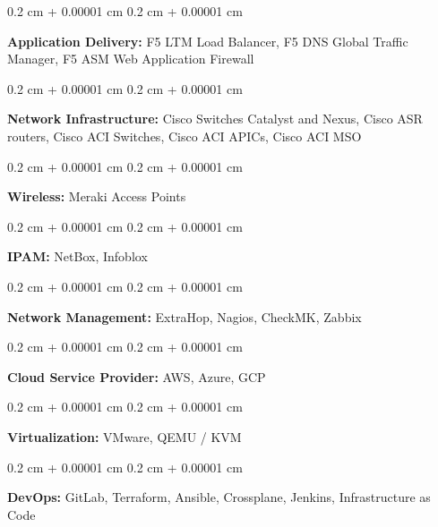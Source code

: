 \documentclass[10pt, a4paper]{article}
\newenvironment{onecolentry}{
    \begin{adjustwidth}{
        0.2 cm + 0.00001 cm
    }{
        0.2 cm + 0.00001 cm
    }
}{
    \end{adjustwidth}
} %
\begin{document}
        \begin{onecolentry}
            \textbf{Application Delivery:} F5 LTM Load Balancer, F5 DNS Global Traffic Manager, F5 ASM Web Application Firewall
        \end{onecolentry}

        \vspace{0.2 cm}

        \begin{onecolentry}
            \textbf{Network Infrastructure:} Cisco Switches Catalyst and Nexus, Cisco ASR routers, Cisco ACI Switches, Cisco ACI APICs, Cisco ACI MSO
        \end{onecolentry}

        \vspace{0.2 cm}

        \begin{onecolentry}
            \textbf{Wireless:} Meraki Access Points
        \end{onecolentry}

        \vspace{0.2 cm}

        \begin{onecolentry}
            \textbf{IPAM:} NetBox, Infoblox
        \end{onecolentry}

        \vspace{0.2 cm}

        \begin{onecolentry}
            \textbf{Network Management:} ExtraHop, Nagios, CheckMK, Zabbix
        \end{onecolentry}

        \vspace{0.2 cm}

        \begin{onecolentry}
            \textbf{Cloud Service Provider:} AWS, Azure, GCP
        \end{onecolentry}

        \vspace{0.2 cm}

        \begin{onecolentry}
            \textbf{Virtualization:} VMware, QEMU / KVM
        \end{onecolentry}

        \vspace{0.2 cm}

        \begin{onecolentry}
            \textbf{DevOps:} GitLab, Terraform, Ansible, Crossplane, Jenkins, Infrastructure as Code
        \end{onecolentry}
\end{document}
